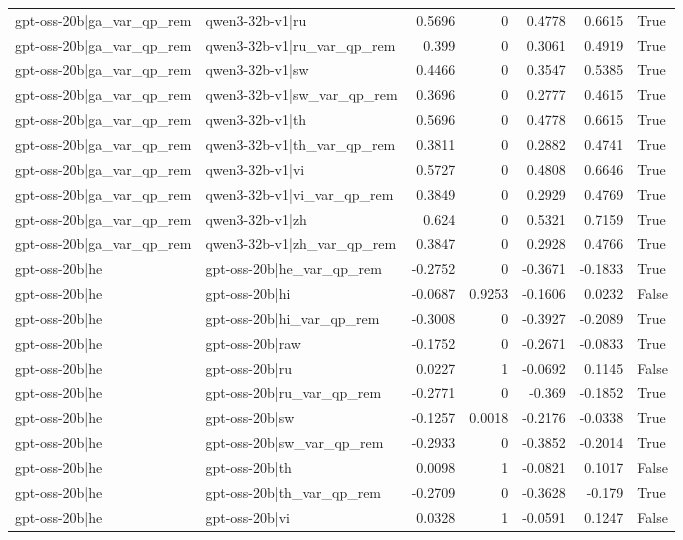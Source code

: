 \begin{table}
\begin{tabular}{l l r r r r l}
gpt-oss-20b|ga_var_qp_rem & qwen3-32b-v1|ru & 0.5696 & 0 & 0.4778 & 0.6615 & True \\
gpt-oss-20b|ga_var_qp_rem & qwen3-32b-v1|ru_var_qp_rem & 0.399 & 0 & 0.3061 & 0.4919 & True \\
gpt-oss-20b|ga_var_qp_rem & qwen3-32b-v1|sw & 0.4466 & 0 & 0.3547 & 0.5385 & True \\
gpt-oss-20b|ga_var_qp_rem & qwen3-32b-v1|sw_var_qp_rem & 0.3696 & 0 & 0.2777 & 0.4615 & True \\
gpt-oss-20b|ga_var_qp_rem & qwen3-32b-v1|th & 0.5696 & 0 & 0.4778 & 0.6615 & True \\
gpt-oss-20b|ga_var_qp_rem & qwen3-32b-v1|th_var_qp_rem & 0.3811 & 0 & 0.2882 & 0.4741 & True \\
gpt-oss-20b|ga_var_qp_rem & qwen3-32b-v1|vi & 0.5727 & 0 & 0.4808 & 0.6646 & True \\
gpt-oss-20b|ga_var_qp_rem & qwen3-32b-v1|vi_var_qp_rem & 0.3849 & 0 & 0.2929 & 0.4769 & True \\
gpt-oss-20b|ga_var_qp_rem & qwen3-32b-v1|zh & 0.624 & 0 & 0.5321 & 0.7159 & True \\
gpt-oss-20b|ga_var_qp_rem & qwen3-32b-v1|zh_var_qp_rem & 0.3847 & 0 & 0.2928 & 0.4766 & True \\
gpt-oss-20b|he & gpt-oss-20b|he_var_qp_rem & -0.2752 & 0 & -0.3671 & -0.1833 & True \\
gpt-oss-20b|he & gpt-oss-20b|hi & -0.0687 & 0.9253 & -0.1606 & 0.0232 & False \\
gpt-oss-20b|he & gpt-oss-20b|hi_var_qp_rem & -0.3008 & 0 & -0.3927 & -0.2089 & True \\
gpt-oss-20b|he & gpt-oss-20b|raw & -0.1752 & 0 & -0.2671 & -0.0833 & True \\
gpt-oss-20b|he & gpt-oss-20b|ru & 0.0227 & 1 & -0.0692 & 0.1145 & False \\
gpt-oss-20b|he & gpt-oss-20b|ru_var_qp_rem & -0.2771 & 0 & -0.369 & -0.1852 & True \\
gpt-oss-20b|he & gpt-oss-20b|sw & -0.1257 & 0.0018 & -0.2176 & -0.0338 & True \\
gpt-oss-20b|he & gpt-oss-20b|sw_var_qp_rem & -0.2933 & 0 & -0.3852 & -0.2014 & True \\
gpt-oss-20b|he & gpt-oss-20b|th & 0.0098 & 1 & -0.0821 & 0.1017 & False \\
gpt-oss-20b|he & gpt-oss-20b|th_var_qp_rem & -0.2709 & 0 & -0.3628 & -0.179 & True \\
gpt-oss-20b|he & gpt-oss-20b|vi & 0.0328 & 1 & -0.0591 & 0.1247 & False \\

\end{tabular}
\end{table}
